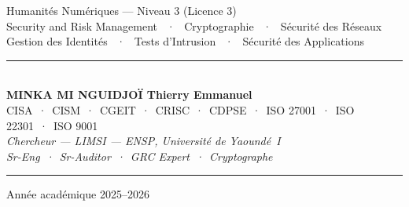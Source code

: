 \documentclass[12pt, a4paper, twoside, openright]{book}
\begin{document}
\begin{titlepage}
\begin{center}
    {\color{white!70!gray}\small
        \quad Humanités Numériques — Niveau 3 (Licence 3)}\\[0.5ex]
    {\color{white!70!gray}\small
        \quad Security and Risk Management ~·~ Cryptographie ~·~ Sécurité des Réseaux}\\[0.5ex]
    {\color{white!70!gray}\small
        \quad Gestion des Identités ~·~ Tests d'Intrusion ~·~ Sécurité des Applications}
\end{center}

\vfill

\begin{center}
    {\color{CouleurAccent}\rule{0.7\linewidth}{1.2pt}}\\[1.2ex]
    {\color{white}\large\bfseries MINKA MI NGUIDJOÏ Thierry Emmanuel}\\[0.4ex]
    {\color{white!80!gray}\small
        CISA~·~CISM~·~CGEIT~·~CRISC~·~CDPSE~·~ISO 27001~·~ISO 22301~·~ISO 9001}\\[0.3ex]
    {\color{white!70!gray}\footnotesize\itshape
        Chercheur — LIMSI — ENSP, Université de Yaoundé~I}\\[0.3ex]
    {\color{white!70!gray}\footnotesize\itshape
        Sr-Eng~·~Sr-Auditor~·~GRC Expert~·~Cryptographe}\\[1.2ex]
    {\color{CouleurAccent}\rule{0.7\linewidth}{1.2pt}}
\end{center}

\vspace{0.6cm}

\begin{center}
    {\color{white!60!gray}\small Année académique 2025--2026}
\end{center}

\afterpage{\nopagecolor}
\end{titlepage}

\clearpage
\thispagestyle{empty}
\vspace*{\fill}
\end{document}
